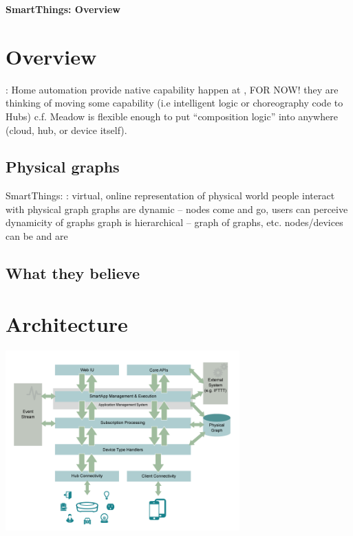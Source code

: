 \documentclass{myproc}
\begin{document}
\small


\begin{center}
{\large\bf SmartThings: Overview}
\end{center}

\vspace*{1cm}

\tableofcontents


\section{Overview}
\bit
\w {}: Home automation
\w {} provide native capability
\w {} happen at , FOR NOW!
  \bit
  \w they are thinking of moving some capability (i.e intelligent logic or
  choreography code to Hubs) 
  \w c.f. Meadow is flexible enough to put ``composition logic'' into
  anywhere (cloud, hub, or device itself). 
  \eit
\eit

\subsection{Physical graphs}
\bit
\w SmartThings: \textcolor{red2}{}
\w {}: virtual, online representation of physical world
\w people interact with physical graph
\w graphs are dynamic -- nodes come and go, users can perceive dynamicity of
graphs 
\w graph is hierarchical -- graph of graphs, etc.
\w nodes/devices can be  and are 
\eit

\subsection{What they believe}
\bit
\w {}
\eit

\section{Architecture}

\includegraphics[width=9cm]{pics/arch}
\end{document}
